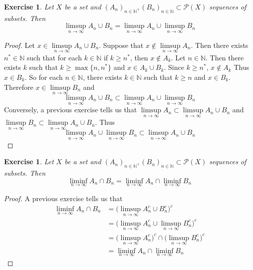 \documentclass[12pt]{amsart}
\newtheorem{ex}[thm]{Exercise}
\newcommand{\N}{\mathbb{N}}
\newcommand{\MP}{\mathcal{P}}
\begin{document}
\begin{ex}
Let $X$ be a set and $(A_n)_{n \in \N}, (B_n)_{n \in \N} \subset \MP(X)$ sequences of subsets. Then $$\limsup\limits_{n \rightarrow \infty} A_n \cup B_n= \limsup\limits_{n \rightarrow \infty} A_n \cup \limsup\limits_{n \rightarrow \infty} B_n$$
\end{ex}

\begin{proof}
Let $x \in \limsup\limits_{n \rightarrow \infty} A_n \cup B_n$. Suppose that $x \not \in \limsup\limits_{n \rightarrow \infty} A_n$. Then there exists $n^* \in \N$ such that for each $k \in \N$ if $ k \geq n^*$, then $x \not \in A_k$. Let $n \in \N$. Then there exists $k$ such that $k \geq \max\{n, n^*\}$ and $x \in A_{k} \cup B_k$. Since $k \geq n^*$, $x \not \in A_{k}$ Thus $x \in B_k$. So for each $n \in \N$, there exists $k \in \N$ such that $k \geq n$ and $x \in B_k$. Therefore $x \in \limsup\limits_{n \rightarrow \infty}  B_n$ and $$\limsup\limits_{n \rightarrow \infty} A_n \cup B_n \subset \limsup\limits_{n \rightarrow \infty} A_n \cup \limsup\limits_{n \rightarrow \infty} B_n$$ Conversely, a previous exercise tells us that $\limsup\limits_{n \rightarrow \infty} A_n \subset \limsup\limits_{n \rightarrow \infty} A_n \cup B_n$ and $\limsup\limits_{n \rightarrow \infty}  B_n \subset \limsup\limits_{n \rightarrow \infty} A_n \cup B_n$. Thus $$ \limsup\limits_{n \rightarrow \infty} A_n \cup \limsup\limits_{n \rightarrow \infty} B_n \subset \limsup\limits_{n \rightarrow \infty} A_n \cup B_n$$
\end{proof}

\begin{ex}
Let $X$ be a set and $(A_n)_{n \in \N}, (B_n)_{n \in \N} \subset \MP(X)$ sequences of subsets. Then $$\liminf\limits_{n \rightarrow \infty} A_n \cap B_n= \liminf\limits_{n \rightarrow \infty} A_n \cap \liminf\limits_{n \rightarrow \infty} B_n$$
\end{ex}

\begin{proof}
A previous exercise tells us that 
\begin{align*}
\liminf\limits_{n \rightarrow \infty} A_n \cap B_n
&= \bigg( \limsup\limits_{n \rightarrow \infty} A_n^c \cup B_n^c \bigg)^c \\
&= \bigg( \limsup\limits_{n \rightarrow \infty} A_n^c \cup \limsup\limits_{n \rightarrow \infty}B_n^c \bigg)^c \\
&= \bigg( \limsup\limits_{n \rightarrow \infty} A_n^c \bigg)^c \cap \bigg( \limsup\limits_{n \rightarrow \infty}B_n^c \bigg)^c \\
&= \liminf\limits_{n \rightarrow \infty} A_n \cap \liminf\limits_{n \rightarrow \infty}  B_n
\end{align*}
\end{proof}
\end{document}
